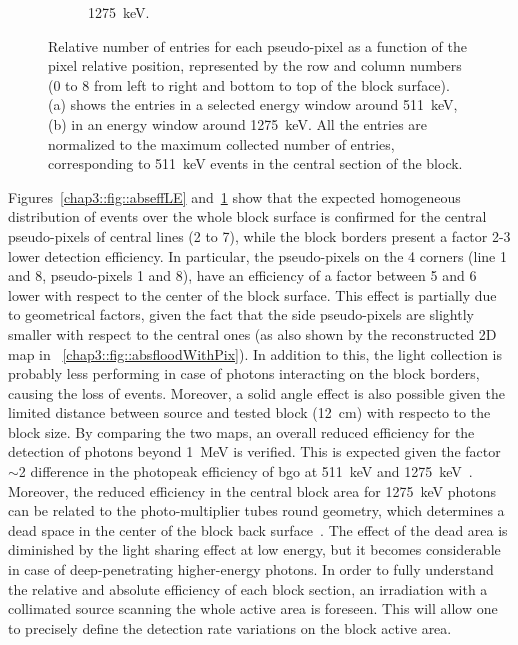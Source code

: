 \begin{figure}
\begin{subfigure}[t]{0.5\textwidth}
\caption{1275~keV.}
\label{chap3::fig::abseffHE}
\end{subfigure}
\caption{Relative number of entries for each pseudo-pixel as a function of the pixel relative position, represented by the row and column numbers (0 to 8 from left to right and bottom to top of the block surface). \figurename (a) shows the entries in a selected energy window around 511~keV, \figurename (b) in an energy window around 1275~keV. All the entries are normalized to the maximum collected number of entries, corresponding to 511~keV events in the central section of the block.}
\label{chap3::fig::absefficiency}
\end{figure}

Figures~\ref{chap3::fig::abseffLE} and~\ref{chap3::fig::abseffHE} show that the expected homogeneous distribution of events over the whole block surface is confirmed for the central pseudo-pixels of central lines (2 to 7), while the block borders present a factor 2-3 lower detection efficiency. In particular, the pseudo-pixels on the 4 corners (line 1 and 8, pseudo-pixels 1 and 8), have an efficiency of a factor between 5 and 6 lower with respect to the center of the block surface. This effect is partially due to geometrical factors, given the fact that the side pseudo-pixels are slightly smaller with respect to the central ones (as also shown by the reconstructed 2D map in \figurename~\ref{chap3::fig::absfloodWithPix}). In addition to this, the light collection is probably less performing in case of photons interacting on the block borders, causing the loss of events. Moreover, a solid angle effect is also possible given the limited distance between source and tested block (12~cm) with respecto to the block size. By comparing the two maps, an overall reduced efficiency for the detection of photons beyond 1~MeV is verified. This is expected given the factor $\sim$2 difference in the photopeak efficiency of \gls{bgo} at 511~keV and 1275~keV~\parencite{SaintGobain2016}. Moreover, the reduced efficiency in the central block area for 1275~keV photons can be related to the photo-multiplier tubes round geometry, which determines a dead space in the center of the block back surface~\parencite{Uribe2003}. The effect of the dead area is diminished by the light sharing effect at low energy, but it becomes considerable in case of deep-penetrating higher-energy photons. In order to fully understand the relative and absolute efficiency of each block section, an irradiation with a collimated source scanning the whole active area is foreseen. This will allow one to precisely define the detection rate variations on the block active area.

